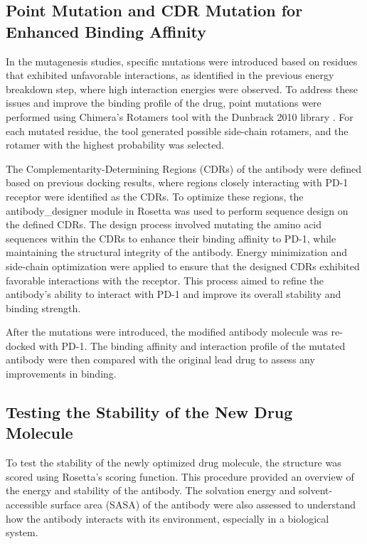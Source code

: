 \documentclass[11pt]{article}
\begin{document}
\subsection{Point Mutation and CDR Mutation for Enhanced Binding Affinity}  

In the mutagenesis studies, specific mutations were introduced based on residues that exhibited unfavorable interactions, as identified in the previous energy breakdown step, where high interaction energies were observed. To address these issues and improve the binding profile of the drug, point mutations were performed using Chimera’s Rotamers tool with the Dunbrack 2010 library \cite{shapovalov2011}. For each mutated residue, the tool generated possible side-chain rotamers, and the rotamer with the highest probability was selected. 

The Complementarity-Determining Regions (CDRs) of the antibody were defined based on previous docking results, where regions closely interacting with PD-1 receptor were identified as the CDRs. To optimize these regions, the antibody\_designer module in Rosetta was used to perform sequence design on the defined CDRs. The design process involved mutating the amino acid sequences within the CDRs to enhance their binding affinity to PD-1, while maintaining the structural integrity of the antibody. Energy minimization and side-chain optimization were applied to ensure that the designed CDRs exhibited favorable interactions with the receptor. This process aimed to refine the antibody's ability to interact with PD-1 and improve its overall stability and binding strength.

After the mutations were introduced, the modified antibody molecule was re-docked with PD-1. The binding affinity and interaction profile of the mutated antibody were then compared with the original lead drug to assess any improvements in binding.

\subsection{Testing the Stability of the New Drug Molecule}  
To test the stability of the newly optimized drug molecule, the structure was scored using Rosetta's scoring function. This procedure provided an overview of the energy and stability of the antibody. The solvation energy and solvent-accessible surface area (SASA) of the antibody were also assessed to understand how the antibody interacts with its environment, especially in a biological system.
\end{document}
